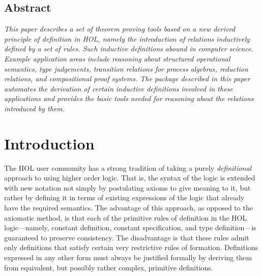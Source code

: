 
\pagestyle{plain}
\flushbottom
\sloppy



\sloppy




\subsection*{\centering Abstract} 

{\it\sloppy This paper describes a set of theorem proving tools based on a new
derived principle of definition in HOL, namely the introduction of relations
inductively defined by a set of rules.  Such inductive definitions abound in
computer science. Example application areas \mbox{include} reasoning about
structured operational semantics, type judgements, transition relations for
process algebras, \mbox{reduction} relations, and compositional proof systems.
The package described in this paper automates the derivation of certain
inductive definitions involved in these applications and provides the basic
tools needed for reasoning about the relations introduced by them.}

\vskip12pt
\section{Introduction}

The HOL user community has a strong tradition of taking a purely {\it
definitional\/} approach to using higher order logic. That is, the syntax of
the logic is extended with new notation not simply by postulating axioms to
give meaning to it, but rather by defining it in terms of existing expressions
of the logic that already have the required semantics.  The advantage of this
approach, as opposed to the axiomatic method, is that each of the primitive
rules of definition in the {\small HOL} logic---namely, constant definition,
constant specification, and type definition---is guaranteed to preserve
consistency.  The disadvantage is that these rules admit only
\mbox{definitions} that satisfy certain very restrictive rules of formation.
Definitions expressed in any other form must always be justified formally by
deriving them from equivalent, but possibly rather complex, primitive
definitions.

